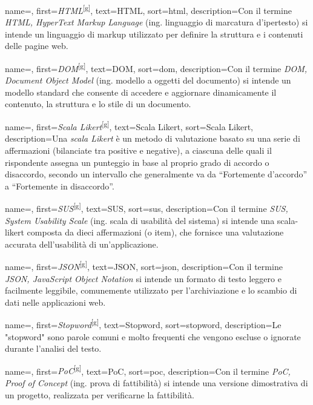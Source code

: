  {
    name=,
    first={\textit{HTML}\textsuperscript{[g]}},
    text=HTML,
    sort=html,
    description={Con il termine \emph{HTML, HyperText Markup Language} (ing. linguaggio di marcatura d'ipertesto) si intende un linguaggio di markup utilizzato per definire la struttura e i contenuti delle pagine web.}
}

 {
    name=,
    first={\textit{DOM}\textsuperscript{[g]}},
    text=DOM,
    sort=dom,
    description={Con il termine \emph{DOM, Document Object Model} (ing. modello a oggetti del documento) si intende un modello standard che consente di accedere e aggiornare dinamicamente il contenuto, la struttura e lo stile di un documento.}
}

 {
    name=,
    first={\textit{Scala Likert}\textsuperscript{[g]}},
    text=Scala Likert,
    sort=Scala Likert,
    description={Una \emph{scala Likert} è un metodo di valutazione basato su una serie di affermazioni (bilanciate tra positive e negative), a ciascuna delle quali il rispondente assegna un punteggio in base al proprio grado di accordo o disaccordo, secondo un intervallo che generalmente va da “Fortemente d'accordo” a “Fortemente in disaccordo”.}
}

 {
    name=,
    first={\textit{SUS}\textsuperscript{[g]}},
    text=SUS,
    sort=sus,
    description={Con il termine \emph{SUS, System Usability Scale} (ing. scala di usabilità del sistema) si intende una \gls{scala-likert} composta da dieci affermazioni (o item), che fornisce una valutazione accurata dell'usabilità di un'applicazione.}
}

 {
    name=,
    first={\textit{JSON}\textsuperscript{[g]}},
    text=JSON,
    sort=json,
    description={Con il termine \emph{JSON, JavaScript Object Notation} si intende un formato di testo leggero e facilmente leggibile, comunemente utilizzato per l’archiviazione e lo scambio di dati nelle applicazioni web.}
}

 {
    name=,
    first={\textit{Stopword}\textsuperscript{[g]}},
    text=Stopword,
    sort=stopword,
    description={Le "stopword" sono parole comuni e molto frequenti che vengono escluse o ignorate durante l’analisi del testo.}
}

 {
    name=,
    first={\textit{PoC}\textsuperscript{[g]}},
    text=PoC,
    sort=poc,
    description={Con il termine \emph{PoC, Proof of Concept} (ing. prova di fattibilità) si intende una versione dimostrativa di un progetto, realizzata per verificarne la fattibilità.}
}
